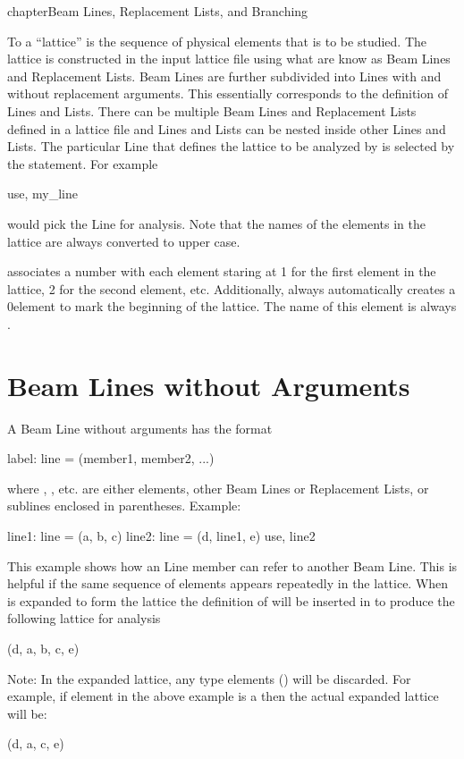 chapter{Beam Lines, Replacement Lists, and Branching}
\label{c:sequence}

To \bmad a ``lattice'' is the sequence of physical
elements that is to be studied. The lattice is constructed in the
input lattice file using what are know as Beam Lines and Replacement
Lists. Beam Lines are further subdivided into Lines with and without
replacement arguments. This essentially corresponds to the \mad
definition of Lines and Lists. There can be multiple Beam Lines and
Replacement Lists defined in a lattice file and Lines and Lists can be
nested inside other Lines and Lists. The particular Line that defines
the lattice to be analyzed by \bmad is selected by the 
statement. For example
\begin{example}
  use, my_line
\end{example}
would pick the Line  for analysis. 
Note that the names of the elements in the
lattice are always converted to upper case.

\bmad associates a number with each element staring at 1 for the first
element in the lattice, 2 for the second element, etc. Additionally,
\bmad always automatically creates a 0\Th element to mark the
beginning of the lattice. The name of this element is always .

\section{Beam Lines without Arguments}
\label{s:lines.wo.arg}

A Beam Line without arguments has the format
\begin{example}
  label: line = (member1, member2, ...)
\end{example}
where , , etc. are either elements, other Beam
Lines or Replacement Lists, or sublines enclosed in parentheses.
Example:
\begin{example}
  line1: line = (a, b, c)
  line2: line = (d, line1, e)
  use, line2
\end{example}
This example shows how an Line member can refer to another Beam Line.
This is helpful if the same sequence of elements appears repeatedly in
the lattice. When  is expanded to form the lattice the
definition of  will be inserted in to produce the following
lattice for analysis
\begin{example}
  (d, a, b, c, e)
\end{example}
Note: In the expanded lattice, any  type elements
() will be discarded. For example, if element 
in the above example is a  then the actual expanded
lattice will be:
\begin{example}
  (d, a, c, e)
\end{example}

